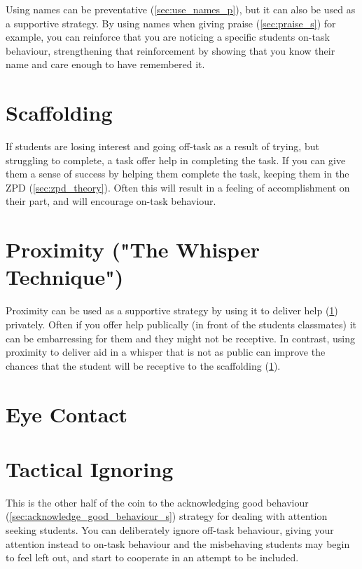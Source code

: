 \documentclass[12pt]{report}
\begin{document}
Using names can be preventative (\ref{sec:use_names_p}), but it can also be used as a supportive strategy. By using names when giving praise (\ref{sec:praise_s}) for example, you can reinforce that you are noticing a specific students on-task behaviour, strengthening that reinforcement by showing that you know their name and care enough to have remembered it.



\section{Scaffolding}
\label{sec:scaffolding_s}

If students are losing interest and going off-task as a result of trying, but struggling to complete, a task offer help in completing the task. If you can give them a sense of success by helping them complete the task, keeping them in the ZPD (\ref{sec:zpd_theory}). Often this will result in a feeling of accomplishment on their part, and will encourage on-task behaviour.



\section{Proximity ("The Whisper Technique")}
\label{sec:proximity_s}

Proximity can be used as a supportive strategy by using it to deliver help (\ref{sec:scaffolding_s}) privately. Often if you offer help publically (in front of the students classmates) it can be embarressing for them and they might not be receptive. In contrast, using proximity to deliver aid in a whisper that is not as public can improve the chances that the student will be receptive to the scaffolding (\ref{sec:scaffolding_s}).



\section{Eye Contact}
\label{sec:eye_contact_s}



\section{Tactical Ignoring}
\label{sec:tactical_ignoring_s}

This is the other half of the coin to the acknowledging good behaviour (\ref{sec:acknowledge_good_behaviour_s}) strategy for dealing with attention seeking students. You can deliberately ignore off-task behaviour, giving your attention instead to on-task behaviour and the misbehaving students may begin to feel left out, and start to cooperate in an attempt to be included.
\end{document}
